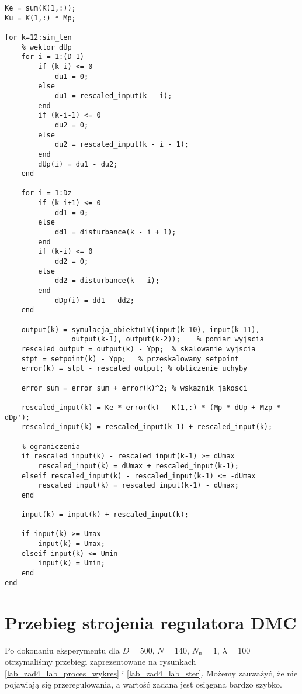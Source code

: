 \begin{lstlisting}[style=custommatlab,frame=single,label={zad4_dmc_sim_lst},caption={Pętla symulująca działanie regulatora DMC},captionpos=b]
Ke = sum(K(1,:));
Ku = K(1,:) * Mp;

for k=12:sim_len    
    % wektor dUp
    for i = 1:(D-1)
        if (k-i) <= 0
            du1 = 0;
        else
            du1 = rescaled_input(k - i);
        end
        if (k-i-1) <= 0
            du2 = 0;
        else
            du2 = rescaled_input(k - i - 1);
        end 
        dUp(i) = du1 - du2;
    end

    for i = 1:Dz            
        if (k-i+1) <= 0
            dd1 = 0;
        else
            dd1 = disturbance(k - i + 1);
        end
        if (k-i) <= 0
            dd2 = 0;
        else
            dd2 = disturbance(k - i);
        end             
            dDp(i) = dd1 - dd2;
    end           

    output(k) = symulacja_obiektu1Y(input(k-10), input(k-11),
    			output(k-1), output(k-2));    % pomiar wyjscia
    rescaled_output = output(k) - Ypp;  % skalowanie wyjscia   
    stpt = setpoint(k) - Ypp;   % przeskalowany setpoint
    error(k) = stpt - rescaled_output; % obliczenie uchyby   
    
    error_sum = error_sum + error(k)^2; % wskaznik jakosci
    
    rescaled_input(k) = Ke * error(k) - K(1,:) * (Mp * dUp + Mzp * dDp');
    rescaled_input(k) = rescaled_input(k-1) + rescaled_input(k);
    
    % ograniczenia  
    if rescaled_input(k) - rescaled_input(k-1) >= dUmax
        rescaled_input(k) = dUmax + rescaled_input(k-1);
    elseif rescaled_input(k) - rescaled_input(k-1) <= -dUmax
        rescaled_input(k) = rescaled_input(k-1) - dUmax;
    end   
    
    input(k) = input(k) + rescaled_input(k);  
    
    if input(k) >= Umax
        input(k) = Umax;
    elseif input(k) <= Umin
        input(k) = Umin;
    end 
end
\end{lstlisting}

\iffalse
\section{Przebieg strojenia regulatora DMC}

Po dokonaniu eksperymentu dla $D = 500$, $N = 140$, $N_\mathrm{u} = 1$, 
$\lambda = 100$ otrzymaliśmy przebiegi zaprezentowane na rysunkach 
\ref{lab_zad4_lab_proces_wykres} i \ref{lab_zad4_lab_ster}. Możemy zauważyć, 
że nie pojawiają się przeregulowania, a wartość zadana jest osiągana bardzo szybko. 

